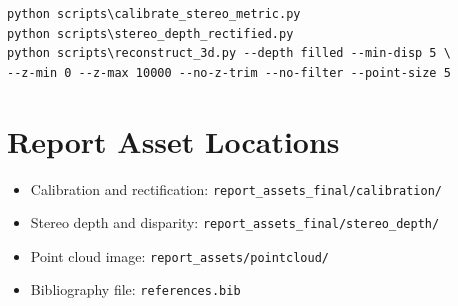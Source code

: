 \documentclass[11pt,a4paper]{article}
\begin{document}
\begin{verbatim}
python scripts\calibrate_stereo_metric.py
python scripts\stereo_depth_rectified.py
python scripts\reconstruct_3d.py --depth filled --min-disp 5 \
--z-min 0 --z-max 10000 --no-z-trim --no-filter --point-size 5
\end{verbatim}

\section*{Report Asset Locations}

\begin{itemize}
    \item Calibration and rectification: \texttt{report\_assets\_final/calibration/}
    \item Stereo depth and disparity: \texttt{report\_assets\_final/stereo\_depth/}
    \item Point cloud image: \texttt{report\_assets/pointcloud/}
    \item Bibliography file: \texttt{references.bib}
\end{itemize}

\FloatBarrier


\end{document}
